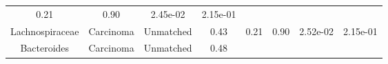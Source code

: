 \documentclass[12pt,]{article}
\begin{document}
\begin{longtable}[]{@{}cccccccc@{}}
\begin{minipage}[t]{0.13\columnwidth}
0.21\strut
\end{minipage} & \begin{minipage}[t]{0.13\columnwidth}\centering\strut
0.90\strut
\end{minipage} & \begin{minipage}[t]{0.07\columnwidth}\centering\strut
2.45e-02\strut
\end{minipage} & \begin{minipage}[t]{0.07\columnwidth}\centering\strut
2.15e-01\strut
\end{minipage}\tabularnewline
\begin{minipage}[t]{0.16\columnwidth}\centering\strut
Lachnospiraceae\strut
\end{minipage} & \begin{minipage}[t]{0.08\columnwidth}\centering\strut
Carcinoma\strut
\end{minipage} & \begin{minipage}[t]{0.09\columnwidth}\centering\strut
Unmatched\strut
\end{minipage} & \begin{minipage}[t]{0.05\columnwidth}\centering\strut
0.43\strut
\end{minipage} & \begin{minipage}[t]{0.13\columnwidth}\centering\strut
0.21\strut
\end{minipage} & \begin{minipage}[t]{0.13\columnwidth}\centering\strut
0.90\strut
\end{minipage} & \begin{minipage}[t]{0.07\columnwidth}\centering\strut
2.52e-02\strut
\end{minipage} & \begin{minipage}[t]{0.07\columnwidth}\centering\strut
2.15e-01\strut
\end{minipage}\tabularnewline
\begin{minipage}[t]{0.16\columnwidth}\centering\strut
Bacteroides\strut
\end{minipage} & \begin{minipage}[t]{0.08\columnwidth}\centering\strut
Carcinoma\strut
\end{minipage} & \begin{minipage}[t]{0.09\columnwidth}\centering\strut
Unmatched\strut
\end{minipage} & \begin{minipage}[t]{0.05\columnwidth}\centering\strut
0.48\strut
\end{minipage} & \begin{minipage}[t]{0.13\columnwidth}\centering\strut

\end{minipage}
\end{longtable}
\end{document}
